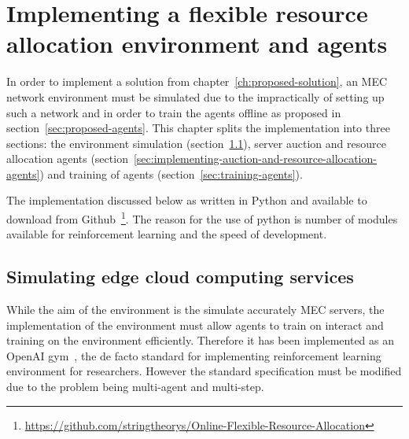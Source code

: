 

\chapter{Implementing a flexible resource allocation environment and agents}\label{ch:implementation-of-the-solution}
In order to implement a solution from chapter~\ref{ch:proposed-solution}, an MEC network environment
must be simulated due to the impractically of setting up such a network and in order to train the agents offline as
proposed in section~\ref{sec:proposed-agents}. This chapter splits the implementation into three sections: the
environment simulation (section~\ref{sec:simulating-edge-cloud-computing-services}), server auction and resource
allocation agents (section~\ref{sec:implementing-auction-and-resource-allocation-agents}) and training of agents
(section~\ref{sec:training-agents}).

The implementation discussed below as written in Python and available to download from
Github~\footnote{\url{https://github.com/stringtheorys/Online-Flexible-Resource-Allocation}}. The reason for the use of
python is number of modules available for reinforcement learning and the speed of development.

\section{Simulating edge cloud computing services}\label{sec:simulating-edge-cloud-computing-services}
While the aim of the environment is the simulate accurately MEC servers, the implementation of the environment must
allow agents to train on interact and training on the environment efficiently. Therefore it has been implemented
as an OpenAI gym~\citep{openaigym}, the de facto standard for implementing reinforcement learning environment for
researchers. However the standard specification must be modified due to the problem being multi-agent and multi-step.

